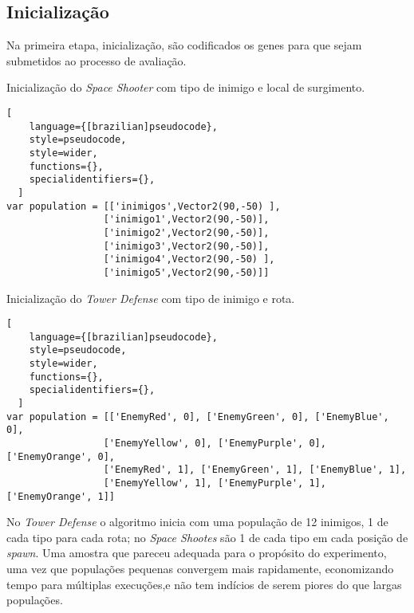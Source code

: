 \subsection{Inicialização}
\label{sec:ag-inicializacao}

Na primeira etapa, inicialização, são codificados os genes para que sejam submetidos ao processo de avaliação. 

\pagebreak

\begin{programruledcaption}{Inicialização do \textit{Space Shooter} com tipo de inimigo e local de surgimento.\label{prog:init-ss}}
  \begin{lstlisting}[
    language={[brazilian]pseudocode},
    style=pseudocode,
    style=wider,
    functions={},
    specialidentifiers={},
  ]
var population = [['inimigos',Vector2(90,-50) ], 
                 ['inimigo1',Vector2(90,-50)], 
                 ['inimigo2',Vector2(90,-50)], 
                 ['inimigo3',Vector2(90,-50)], 
                 ['inimigo4',Vector2(90,-50) ],
                 ['inimigo5',Vector2(90,-50)]]
  \end{lstlisting}
\end{programruledcaption}

\begin{programruledcaption}{Inicialização do \textit{Tower Defense} com tipo de inimigo e rota.\label{prog:init-td}}
  \begin{lstlisting}[
    language={[brazilian]pseudocode},
    style=pseudocode,
    style=wider,
    functions={},
    specialidentifiers={},
  ]
var population = [['EnemyRed', 0], ['EnemyGreen', 0], ['EnemyBlue', 0],
                 ['EnemyYellow', 0], ['EnemyPurple', 0], ['EnemyOrange', 0],
                 ['EnemyRed', 1], ['EnemyGreen', 1], ['EnemyBlue', 1],
                 ['EnemyYellow', 1], ['EnemyPurple', 1], ['EnemyOrange', 1]]
  \end{lstlisting}
\end{programruledcaption}

No \textit{Tower Defense} o algoritmo inicia com uma população de 12 inimigos, 1 de cada tipo para cada rota; no \textit{Space Shootes} são 1 de cada tipo em cada posição de \textit{spawn}. Uma amostra que pareceu adequada para o propósito do experimento, uma vez que populações pequenas convergem mais rapidamente, economizando tempo para múltiplas execuções,e não tem indícios de serem piores do que largas populações. \citet{haupt00:mutationprob}

